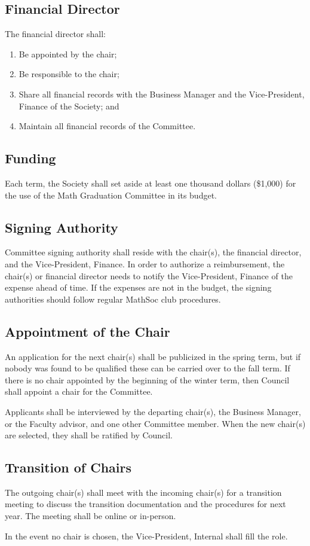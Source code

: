 \subsection{Financial Director}
The financial director shall:
\begin{enumerate}
\item Be appointed by the chair;
\item Be responsible to the chair;
\item Share all financial records with the Business Manager and the Vice-President, Finance of the Society; and
\item Maintain all financial records of the Committee.
\end{enumerate}

\subsection{Funding}
Each term, the Society shall set aside at least one thousand dollars (\$1,000) for the use of the Math Graduation Committee in its budget.

\subsection{Signing Authority}
Committee signing authority shall reside with the chair(s), the financial director, 
and the Vice-President, Finance. In order to authorize a reimbursement, the chair(s) 
or financial director needs to notify the Vice-President, Finance of the expense 
ahead of time. If the expenses are not in the budget, the signing authorities should 
follow regular MathSoc club procedures. 

\subsection{Appointment of the Chair}
An application for the next chair(s) shall be publicized in the spring term, but if 
nobody was found to be qualified these can be carried over to the fall term. If there 
is no chair appointed by the beginning of the winter term, then Council shall appoint 
a chair for the Committee.

Applicants shall be interviewed by the departing chair(s), the Business Manager, 
or the Faculty advisor, and one other Committee member.
When the new chair(s) are selected, they shall be ratified by Council.

\subsection{Transition of Chairs}
The outgoing chair(s) shall meet with the incoming chair(s) for a transition 
meeting to discuss the transition documentation and the procedures for next year. The 
meeting shall be online or in-person.

In the event no chair is chosen, the Vice-President, Internal shall fill the role.
